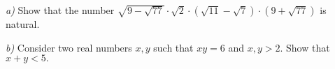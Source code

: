 \textit{a)} Show that the number $ \sqrt{9-\sqrt{77}}\cdot\sqrt {2}\cdot\left(\sqrt{11}-\sqrt{7}\right)\cdot\left( 9+\sqrt{77}\right) $ is natural.

\textit{b)} Consider two real numbers $ x,y $ such that $ xy=6 $ and $ x,y>2. $ Show that $ x+y<5. $